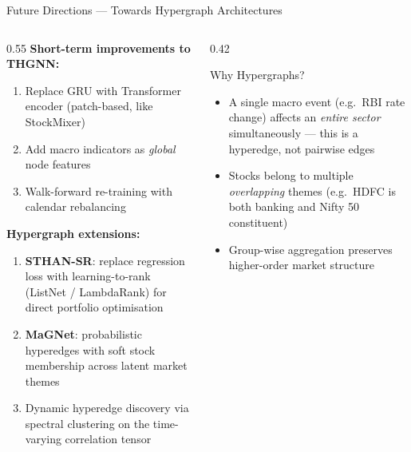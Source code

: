 \documentclass[aspectratio=169, 10pt]{beamer}
\begin{document}
\begin{frame}[shrink=8]{Future Directions — Towards Hypergraph Architectures}
  \begin{columns}[T]
    \begin{column}{0.55\textwidth}
      \textbf{Short-term improvements to THGNN:}
      \begin{enumerate}\setlength{\itemsep}{3pt}
        \item Replace GRU with Transformer encoder (patch-based,
              like StockMixer)
        \item Add macro indicators as \emph{global} node features
        \item Walk-forward re-training with calendar rebalancing
      \end{enumerate}

      \medskip
      \textbf{Hypergraph extensions:}
      \begin{enumerate}\setlength{\itemsep}{3pt}
        \setcounter{enumi}{3}
        \item \textbf{STHAN-SR}: replace regression loss with
              learning-to-rank (ListNet / LambdaRank) for direct
              portfolio optimisation
        \item \textbf{MaGNet}: probabilistic hyperedges with soft
              stock membership across latent market themes
        \item Dynamic hyperedge discovery via spectral clustering on
              the time-varying correlation tensor
      \end{enumerate}
    \end{column}
    \begin{column}{0.42\textwidth}
      \begin{block}{Why Hypergraphs?}
        \begin{itemize}\setlength{\itemsep}{3pt}
          \item A single macro event (e.g.\ RBI rate change) affects an
                \emph{entire sector} simultaneously — this is a
                hyperedge, not pairwise edges
          \item Stocks belong to multiple \emph{overlapping} themes
                (e.g.\ HDFC is both banking and Nifty 50 constituent)
          \item Group-wise aggregation preserves higher-order market
                structure
        \end{itemize}
      \end{block}
    \end{column}
  \end{columns}
\end{frame}
\end{document}
